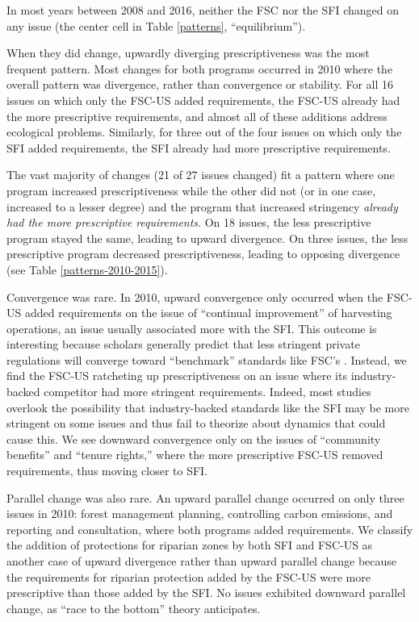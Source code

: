 \documentclass[
      12pt,
            Review ]{article}
\begin{document}
In most years between 2008 and 2016, neither the FSC nor the SFI changed on any issue (the center cell in Table \ref{patterns}, ``equilibrium'').

When they did change, upwardly diverging prescriptiveness was the most frequent pattern. Most changes for both programs occurred in 2010 where the overall pattern was divergence, rather than convergence or stability. For all 16 issues on which only the FSC-US added requirements, the FSC-US already had the more prescriptive requirements, and almost all of these additions address ecological problems. Similarly, for three out of the four issues on which only the SFI added requirements, the SFI already had more prescriptive requirements.

The vast majority of changes (21 of 27 issues changed) fit a pattern where one program increased prescriptiveness while the other did not (or in one case, increased to a lesser degree) and the program that increased stringency \emph{already had the more prescriptive requirements}. On 18 issues, the less prescriptive program stayed the same, leading to upward divergence. On three issues, the less prescriptive program decreased prescriptiveness, leading to opposing divergence (see Table \ref{patterns-2010-2015}).



Convergence was rare. In 2010, upward convergence only occurred when the FSC-US added requirements on the issue of ``continual improvement'' of harvesting operations, an issue usually associated more with the SFI. This outcome is interesting because scholars generally predict that less stringent private regulations will converge toward ``benchmark'' standards like FSC's \citep{Overdevest2005, Overdevest2010}. Instead, we find the FSC-US ratcheting up prescriptiveness on an issue where its industry-backed competitor had more stringent requirements. Indeed, most studies overlook the possibility that industry-backed standards like the SFI may be more stringent on some issues and thus fail to theorize about dynamics that could cause this. We see downward convergence only on the issues of ``community benefits'' and ``tenure rights,'' where the more prescriptive FSC-US removed requirements, thus moving closer to SFI.

Parallel change was also rare. An upward parallel change occurred on only three issues in 2010: forest management planning, controlling carbon emissions, and reporting and consultation, where both programs added requirements. We classify the addition of protections for riparian zones by both SFI and FSC-US as another case of upward divergence rather than upward parallel change because the requirements for riparian protection added by the FSC-US were more prescriptive than those added by the SFI. No issues exhibited downward parallel change, as ``race to the bottom'' theory anticipates.
\end{document}
